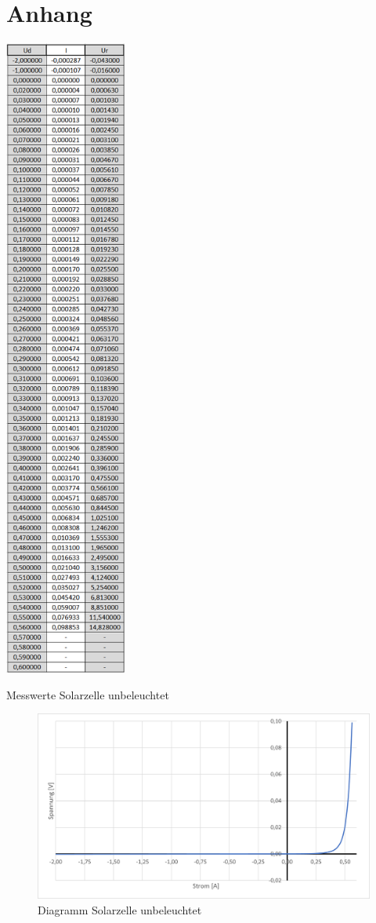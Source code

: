 \documentclass[a4paper]{scrartcl}
\numberwithin{equation}{subsection}
\begin{document}
\newpage

\section{Anhang}
\label{sec:Anhang}
\begin{table}[H]
\includegraphics[width=4cm]{Tabelle_unbeleuchtet}
\centering
\caption{Messwerte Solarzelle unbeleuchtet}
\end{table}

\begin{figure}[H]
\includegraphics[width=14cm]{Diagramm_unbeleuchtet}
\centering
\caption{Diagramm Solarzelle unbeleuchtet}
\centering
\end{figure}
\end{document}
